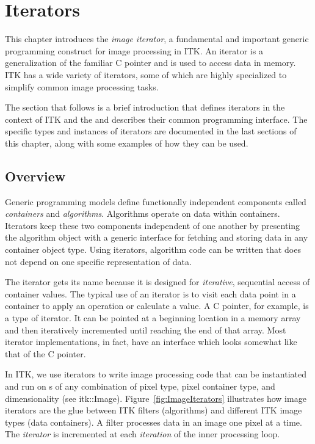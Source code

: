 \chapter{Iterators}

This chapter introduces the \emph{image iterator}, a fundamental and important
generic programming construct for image processing in ITK.  An iterator is a
generalization of the familiar C pointer and is used to access data in memory.  ITK
has a wide variety of iterators, some of which are highly specialized to
simplify common image processing tasks.

The section that follows is a brief introduction that defines iterators in the
context of ITK and the  and describes their common programming
interface.  The specific types and instances of iterators are documented in the
last sections of this chapter, along with some examples of how they can be
used.

\section{Overview}
\label{sec:IteratorsIntroduction}
Generic programming models define functionally independent components called
\emph{containers} and \emph{algorithms}.  Algorithms operate on data
within containers.  Iterators keep these two components independent of one
another by presenting the algorithm object with a generic interface for
fetching and storing data in any container object type.  Using iterators,
algorithm code can be written that does not depend on one specific
representation of data.

The iterator gets its name because it is designed for \emph{iterative},
sequential access of container values.  The typical use of an iterator is to
visit each data point in a container to apply an operation or calculate a
value.  A C pointer, for example, is a type of iterator.  It can be pointed at
a beginning location in a memory array and then iteratively incremented until
reaching the end of that array.  Most iterator implementations, in fact, have
an interface which looks somewhat like that of the C pointer.

In ITK, we use iterators to write image processing code that can be
instantiated and run on s of any combination of pixel type,
pixel container type, and dimensionality (see itk::Image).
Figure~\ref{fig:ImageIterators} illustrates how image iterators are the glue
between ITK filters (algorithms) and different ITK image types (data
containers). A filter processes data in an image one pixel at a time.  The
\emph{iterator} is incremented at each \emph{iteration} of the inner processing
loop.


